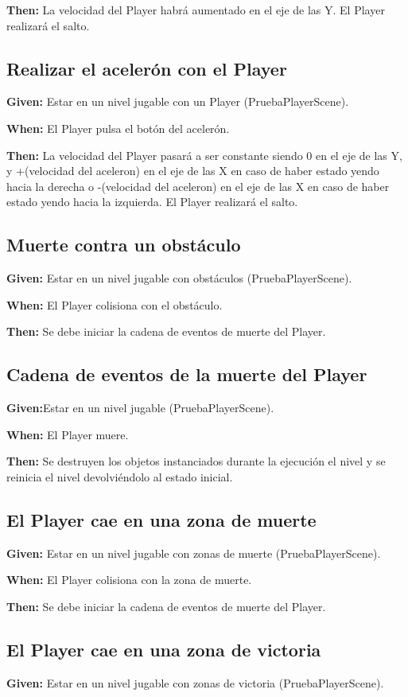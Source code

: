 \textbf{Then:} La velocidad del Player habrá aumentado en el eje de las Y. El Player realizará el salto.

\subsection{Realizar el acelerón con el Player}
\textbf{Given:} Estar en un nivel jugable con un Player (PruebaPlayerScene).

\textbf{When:} El Player pulsa el botón del acelerón.

\textbf{Then:} La velocidad del Player pasará a ser constante siendo 0 en el eje de las Y, y +(velocidad del aceleron) en el eje de las X en caso de haber estado yendo hacia la derecha o -(velocidad del aceleron) en el eje de las X en caso de haber estado yendo hacia la izquierda. El Player realizará el salto.

\subsection{Muerte contra un obstáculo}
\textbf{Given:} Estar en un nivel jugable con obstáculos (PruebaPlayerScene).

\textbf{When:} El Player colisiona con el obstáculo.

\textbf{Then:} Se debe iniciar la cadena de eventos de muerte del Player.

\subsection{Cadena de eventos de la muerte del Player}
\textbf{Given:}Estar en un nivel jugable (PruebaPlayerScene).

\textbf{When:} El Player muere.

\textbf{Then:} Se destruyen los objetos instanciados durante la ejecución el nivel y se reinicia el nivel devolviéndolo al estado inicial.

\subsection{El Player cae en una zona de muerte}
\textbf{Given:} Estar en un nivel jugable con zonas de muerte (PruebaPlayerScene).

\textbf{When:} El Player colisiona con la zona de muerte.

\textbf{Then:} Se debe iniciar la cadena de eventos de muerte del Player.

\subsection{El Player cae en una zona de victoria}
\textbf{Given:} Estar en un nivel jugable con zonas de victoria (PruebaPlayerScene).

